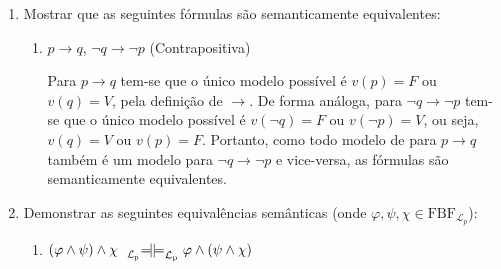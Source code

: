 \begin{enumerate}[label=\arabic*., left=0.5cm, align=left, nosep]
\begin{enumerate}[label=(\alph*), left=0.5cm, align=left, nosep]
                        É consistente. Existe uma e única interpretação que satisfaz todas as fórmulas do conjunto.
                        Esse modelo seria $v(p) = V$ e $v(q) = V$ pois caso contrário $p,q \in \Gamma$ não seriam satisfeitos.
                        Além disso, pela definição do conectivo $\to$, se $v(p) = V$ e $v(q) = V$, então $v(p \to q) = V$.                                 

                        \vspace{0.5cm}
                    \item $\{p, p \to q, \neg q\}$
                    
                        Não é consistente pois não existe uma interpretação que satisfaça todas as fórmulas do conjunto. Isso 
                        acontece pois $v(p) = V$ e $v(q) = F$, necessariamente, pois caso contrário $p,q \in \Gamma$ não seriam 
                        satisfeitos, logo, pela definição do conectivo $\to$, se $v(p) = V$ e $v(q) = F$, então $v(p \to q) = F$.
                
                    \end{enumerate}
            
            \item Mostrar que as seguintes fórmulas são semanticamente equivalentes:
                \begin{enumerate}[label=(\alph*), left=0.5cm, align=left, nosep]
                    \item $p \to q$, $\neg q \to \neg p$ (Contrapositiva)

                        Para $p \to q$ tem-se que o único modelo possível é $v(p) = F$ ou $v(q) = V$, pela definição de $\to$.
                        De forma análoga, para $\neg q \to \neg p$ tem-se que o único modelo possível é $v(\neg q) = F$ ou 
                        $v(\neg p) = V$, ou seja, $v(q) = V$ ou $v(p) = F$. Portanto, como todo modelo de para $p \to q$ 
                        também é um modelo para $\neg q \to \neg p$ e vice-versa, as fórmulas são semanticamente equivalentes.
                
                \end{enumerate}
        
            \item Demonstrar as seguintes equivalências semânticas (onde $\varphi, \psi, \chi \in \mathrm{FBF}_{\mathcal{L}_p}$):
                \begin{enumerate}[label=(\alph*), left=0.5cm, align=left, nosep]
                    \item $(\varphi \land \psi) \land \chi \Lpbimodels \varphi \land (\psi \land \chi)$


\end{enumerate}
\end{enumerate}
